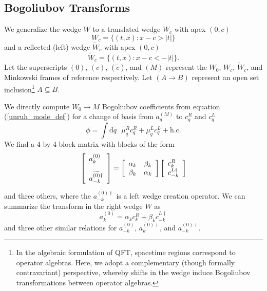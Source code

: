 \documentclass[12pt,a4paper]{article}
\newcommand{\dv}[1]{\mathrm{d} #1 \text{ }}
\begin{document}
\subsection{Bogoliubov Transforms}
We generalize the wedge $W$ to a translated wedge $W_c$ with apex $(0,c)$
\begin{equation}
 W_c = \{(t,x) : x - c > |t|\} 
\end{equation}
and a reflected (left) wedge $\widetilde{W}_c$ with apex $(0,c)$
\begin{equation}
 \widetilde{W}_c = \{(t,x) : x - c < -|t|\}.
\end{equation}
Let the superscripts $(0)$, $(c)$, $(\widetilde{c})$, and $(M)$ represent the $W_0$, $W_c$, $\widetilde{W}_c$, and Minkowski frames of reference respectively.  Let $(A \rightarrow B)$ represent an open set inclusion\footnote{In the algebraic formulation of QFT, spacetime regions correspond to operator algebras. Here, we adopt a complementary (though formally contravariant) perspective, whereby shifts in the wedge induce Bogoliubov transformations between operator algebras.} $A \subseteq B$.

We directly compute $W_0 \rightarrow M$ Bogoliubov coefficients from equation (\ref{unruh_mode_def}) for a change of basis from $a^{(M)}_q$ to $c^R_q$ and $c^L_q$
\begin{equation}
  \phi = \int \dv{q} \mu_q^R c_q^R + \mu_q^L c_q^L + \text{h.c.}
  \label{c_ladder}
\end{equation}
We find a 4 by 4 block matrix with blocks of the form
\begin{equation}
  \left[ \begin{array}{l}
      a^{(0)}_k \vspace{10 pt}\\
    a^{\widetilde{(0)}\dagger}_{-k} \\
 \end{array} \right] = 
  \left[
\begin{array}{cc}
    \alpha_k &      \beta_k \\
    \beta_k        & \alpha_k \\
\end{array} \right]
\left[ \begin{array}{l}
    c^R_k \\
    c^{L\dagger}_{-k} \\
  \end{array} \right]
\label{diag}
\end{equation}
and three others, where the $a^{\widetilde{(0)}\dagger}_{-k}$ is a left wedge creation operator. We can summarize the transform in the right wedge $W$ as
\begin{equation}
  a_k^{(0)} = \alpha_k c_k^R + \beta_k c_{-k}^{L\dagger}
\label{a_in_c}
\end{equation}
and three other similar relations for $a_{-k}^{(0)}$, $a_{k}^{(0)\dagger}$, and $a_{-k}^{(0)\dagger}$.
\end{document}
